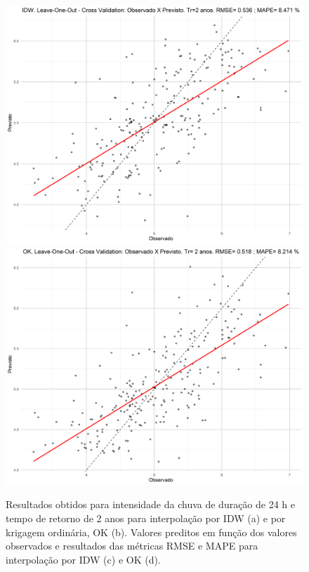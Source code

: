 \documentclass[
]{agujournal2019}
\begin{document}
\begin{figure}
\begin{minipage}{\linewidth}
{}


\end{minipage}%
\newline
\begin{minipage}{\linewidth}
\includegraphics{Figuras/Figura10c.png}
\includegraphics{Figuras/Figura10d.png}\end{minipage}%

\caption{\label{fig-Figura10}Resultados obtidos para intensidade da
chuva de duração de 24 h e tempo de retorno de 2 anos para interpolação
por IDW (a) e por krigagem ordinária, OK (b). Valores preditos em função
dos valores observados e resultados das métricas RMSE e MAPE para
interpolação por IDW (c) e OK (d).}

\end{figure}%
\end{document}
